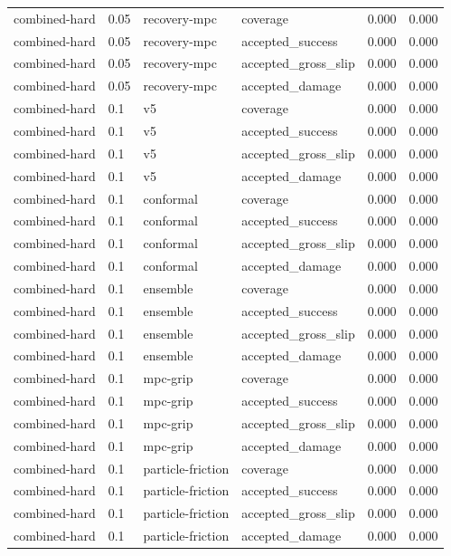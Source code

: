 \documentclass{article}
\begin{document}
\begin{longtable}{@{}ll llrr@{}}
combined-hard & 0.05 & recovery-mpc & coverage & 0.000 & 0.000 \\
combined-hard & 0.05 & recovery-mpc & accepted\_success & 0.000 & 0.000 \\
combined-hard & 0.05 & recovery-mpc & accepted\_gross\_slip & 0.000 & 0.000 \\
combined-hard & 0.05 & recovery-mpc & accepted\_damage & 0.000 & 0.000 \\
combined-hard & 0.1 & v5 & coverage & 0.000 & 0.000 \\
combined-hard & 0.1 & v5 & accepted\_success & 0.000 & 0.000 \\
combined-hard & 0.1 & v5 & accepted\_gross\_slip & 0.000 & 0.000 \\
combined-hard & 0.1 & v5 & accepted\_damage & 0.000 & 0.000 \\
combined-hard & 0.1 & conformal & coverage & 0.000 & 0.000 \\
combined-hard & 0.1 & conformal & accepted\_success & 0.000 & 0.000 \\
combined-hard & 0.1 & conformal & accepted\_gross\_slip & 0.000 & 0.000 \\
combined-hard & 0.1 & conformal & accepted\_damage & 0.000 & 0.000 \\
combined-hard & 0.1 & ensemble & coverage & 0.000 & 0.000 \\
combined-hard & 0.1 & ensemble & accepted\_success & 0.000 & 0.000 \\
combined-hard & 0.1 & ensemble & accepted\_gross\_slip & 0.000 & 0.000 \\
combined-hard & 0.1 & ensemble & accepted\_damage & 0.000 & 0.000 \\
combined-hard & 0.1 & mpc-grip & coverage & 0.000 & 0.000 \\
combined-hard & 0.1 & mpc-grip & accepted\_success & 0.000 & 0.000 \\
combined-hard & 0.1 & mpc-grip & accepted\_gross\_slip & 0.000 & 0.000 \\
combined-hard & 0.1 & mpc-grip & accepted\_damage & 0.000 & 0.000 \\
combined-hard & 0.1 & particle-friction & coverage & 0.000 & 0.000 \\
combined-hard & 0.1 & particle-friction & accepted\_success & 0.000 & 0.000 \\
combined-hard & 0.1 & particle-friction & accepted\_gross\_slip & 0.000 & 0.000 \\
combined-hard & 0.1 & particle-friction & accepted\_damage & 0.000 & 0.000 \\

\end{longtable}
\end{document}
